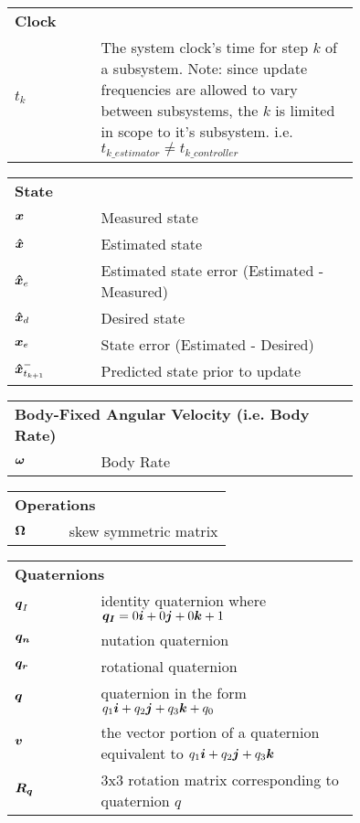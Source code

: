 \documentclass[11pt,doublespace]{unhthesis}
\begin{document}
\begin{nomenclature}

  \begin{tabular}{lp{0.75\linewidth}}
    \multicolumn{2}{l}{\textbf{Clock}} \\
    $t_k$ & The system clock's time for step $k$ of a subsystem.  Note: since update frequencies are allowed to vary between subsystems, the $k$ is limited in scope to it's subsystem.  i.e. $t_{k\_estimator} \ne t_{k\_controller}$ \\
  \end{tabular}

  \begin{tabular}{lp{0.75\linewidth}}
    \multicolumn{2}{l}{\textbf{State}} \\
    $\boldsymbol{x}$ & Measured state \\
    $\boldsymbol{\hat{x}}$ & Estimated state \\
    $\boldsymbol{\hat{x}}_e$ & Estimated state error (Estimated - Measured)\\
    $\boldsymbol{\hat{x}}_d$ & Desired state \\
    $\boldsymbol{x}_e$ & State error (Estimated - Desired) \\
    $\boldsymbol{\hat{x}}_{t_{k+1}}^-$ & Predicted state prior to update \\
  \end{tabular}

  \begin{tabular}{lp{0.75\linewidth}}
    \multicolumn{2}{l}{\textbf{Body-Fixed Angular Velocity (i.e. Body Rate)}} \\
    $\boldsymbol{\omega}$ & Body Rate \\
  \end{tabular}

  \begin{tabular}{lp{0.75\linewidth}}
    \multicolumn{2}{l}{\textbf{Operations}} \\
    $\boldsymbol{\Omega}$ & skew symmetric matrix \\
  \end{tabular}

  \begin{tabular}{lp{0.75\linewidth}}
    \multicolumn{2}{l}{\textbf{Quaternions}} \\
    $\boldsymbol{q}_I$ & identity quaternion where $\boldsymbol{q_I} = 0\boldsymbol{i}+0\boldsymbol{j}+0\boldsymbol{k}+1$ \\
    $\boldsymbol{q_n}$ & nutation quaternion \\
    $\boldsymbol{q_r}$ & rotational quaternion \\
    $\boldsymbol{q}$ & quaternion in the form $q_1\boldsymbol{i}+q_2\boldsymbol{j}+q_3\boldsymbol{k}+q_0$ \\
    $\boldsymbol{v}$ & the vector portion of a quaternion equivalent to $q_1\boldsymbol{i}+q_2\boldsymbol{j}+q_3\boldsymbol{k}$ \\
    $\boldsymbol{R_q}$ & 3x3 rotation matrix corresponding to quaternion $q$ \\
  \end{tabular}


\end{nomenclature}
\end{document}
